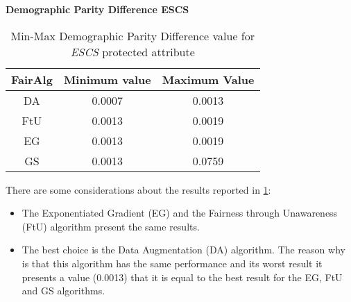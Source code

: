 \newpage
\textbf{Demographic Parity Difference ESCS}
\begin{table}
    \centering
    \begin{tabular}{|c|c|c|}
        \hline
        \textbf{FairAlg} & \textbf{Minimum value} & \textbf{Maximum Value} \\
        \hline
        DA & 0.0007 & 0.0013 \\
        \hline
        FtU & 0.0013 & 0.0019 \\
        \hline
        EG & 0.0013 & 0.0019 \\
        \hline
        GS & 0.0013 & 0.0759 \\
        \hline
    \end{tabular}
    \caption{Min-Max Demographic Parity Difference value for \emph{ESCS} protected attribute}
    \label{tab:e_dpd}
\end{table}

There are some considerations about the results reported in \cref{tab:e_dpd}:

\begin{itemize}
    \item The Exponentiated Gradient (EG) and the Fairness through Unawareness (FtU) algorithm present the same results.

    \item The best choice is the Data Augmentation (DA) algorithm. The reason why is that this algorithm has the same performance and its worst result it presents a value (0.0013) that it is equal to the best result for the EG, FtU and GS algorithms.
\end{itemize}